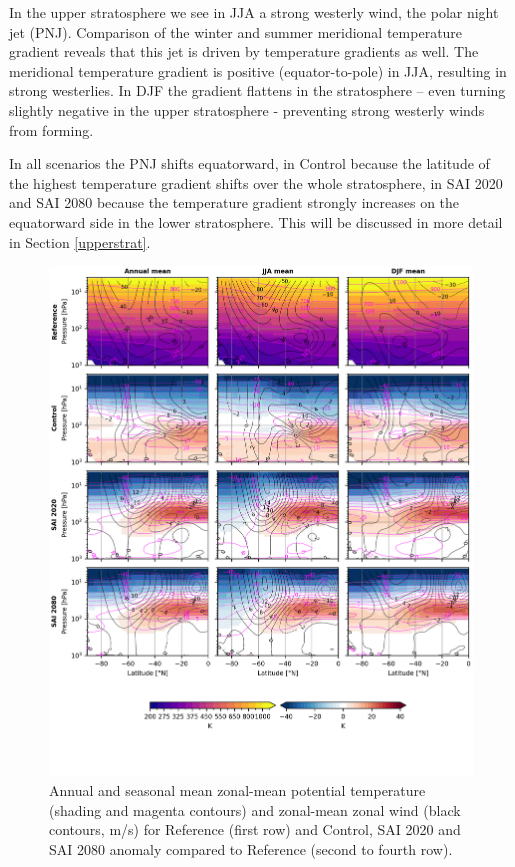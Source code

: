 In the upper stratosphere we see in JJA a strong westerly wind, the polar night jet (PNJ). Comparison of the winter and summer meridional temperature gradient reveals that this jet is driven by temperature gradients as well. The meridional temperature gradient is positive (equator-to-pole) in JJA, resulting in strong westerlies. In DJF the gradient flattens in the stratosphere – even turning slightly negative in the upper stratosphere - preventing strong westerly winds from forming. 

In all scenarios the PNJ shifts equatorward, in Control because the latitude of the highest temperature gradient shifts over the whole stratosphere, in SAI 2020 and SAI 2080 because the temperature gradient strongly increases on the equatorward side in the lower stratosphere. This will be discussed in more detail in Section \ref{upperstrat}.

\begin{figure}[H]
	\centering
	\includegraphics[width=\linewidth]{images/th_U_zmdiff_full.png}
	\caption{Annual and seasonal mean zonal-mean potential temperature (shading and magenta contours) and zonal-mean zonal wind (black contours, m/s) for Reference (first row) and Control, SAI 2020 and SAI 2080 anomaly compared to Reference (second to fourth row).}
	\label{fig:th_U_zmdiff_full}
\end{figure}

